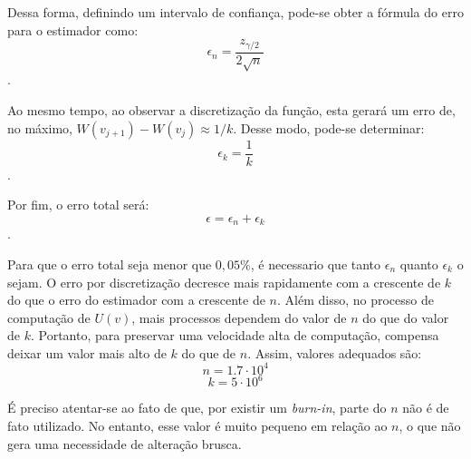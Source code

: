 \documentclass{article}
\begin{document}
Dessa forma, definindo um intervalo de confiança, pode-se obter a fórmula do erro para o estimador como: $$\epsilon_n = \frac{z_{\gamma/2}}{2\sqrt{n}}$$.

Ao mesmo tempo, ao observar a discretização da função, esta gerará um erro de, no máximo, $W(v_{j + 1}) - W(v_j) \approx 1/k$. Desse modo, pode-se determinar: $$\epsilon_k = \frac{1}{k}$$.

Por fim, o erro total será: $$\epsilon = \epsilon_n + \epsilon_k$$.

Para que o erro total seja menor que $0,05\%$, é necessario que tanto $\epsilon_n$ quanto $\epsilon_k$ o sejam. O erro por discretização decresce mais rapidamente com a crescente de $k$ do que o erro do estimador com a crescente de $n$. Além disso, no processo de computação de $U(v)$, mais processos dependem do valor de $n$ do que do valor de $k$. Portanto, para preservar uma velocidade alta de computação, compensa deixar um valor mais alto de $k$ do que de $n$. Assim, valores adequados são: $$n = 1.7 \cdot 10^4$$ $$k = 5 \cdot 10^6$$

É preciso atentar-se ao fato de que, por existir um \textit{burn-in}, parte do $n$ não é de fato utilizado. No entanto, esse valor é muito pequeno em relação ao $n$, o que não gera uma necessidade de alteração brusca.
\end{document}

